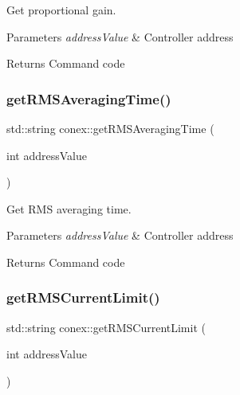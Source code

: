 Get proportional gain. 


\begin{DoxyParams}{Parameters}
{\em address\+Value} & Controller address \\
\hline
\end{DoxyParams}
\begin{DoxyReturn}{Returns}
Command code 
\end{DoxyReturn}
\mbox{\label{namespaceconex_a7c219ac12ae0d8c2385cbf3ef5aa2ed2}} 
\subsubsection{\texorpdfstring{get\+R\+M\+S\+Averaging\+Time()}{getRMSAveragingTime()}}
{\footnotesize\ttfamily std\+::string conex\+::get\+R\+M\+S\+Averaging\+Time (\begin{DoxyParamCaption}\item[{int}]{address\+Value }\end{DoxyParamCaption})}



Get R\+MS averaging time. 


\begin{DoxyParams}{Parameters}
{\em address\+Value} & Controller address \\
\hline
\end{DoxyParams}
\begin{DoxyReturn}{Returns}
Command code 
\end{DoxyReturn}
\mbox{\label{namespaceconex_a7f0202ac44e29e633656eac06ca43cd0}} 
\subsubsection{\texorpdfstring{get\+R\+M\+S\+Current\+Limit()}{getRMSCurrentLimit()}}
{\footnotesize\ttfamily std\+::string conex\+::get\+R\+M\+S\+Current\+Limit (\begin{DoxyParamCaption}\item[{int}]{address\+Value }\end{DoxyParamCaption})}



